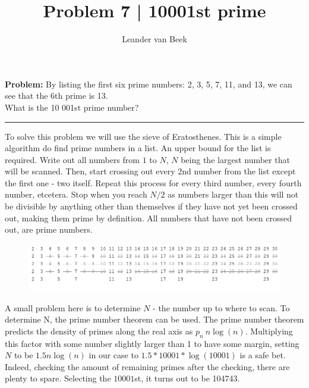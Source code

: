 \documentclass[10pt,a4paper]{article}
\author{Leander van Beek}
\title{Problem 7 | 10001st prime}
\begin{document}
\maketitle

\textbf{Problem:} By listing the first six prime numbers: 2, 3, 5, 7, 11, and 13, we can see that the 6th prime is 13.\\

What is the 10 001st prime number?\\


\vspace{0.5cm}
\hrule
\vspace{0.5cm}

To solve this problem we will use the sieve of Eratosthenes. This is a simple algorithm do find prime numbers in a list. An upper bound for the list is required. Write out all numbers from $1$ to $N$, $N$ being the largest number that will be scanned. Then, start crossing out every 2nd number from the list except the first one - two itself. Repeat this process for every third number, every fourth number, etcetera. Stop when you reach $N/2$ as numbers larger than this will not be divisible by anything other than themselves if they have not yet been crossed out, making them prime by definition. All numbers that have not been crossed out, are prime numbers.\\

\begin{figure}[h]
\centering
\includegraphics[width=0.85\linewidth]{crossings.png}
\end{figure}

A small problem here is to determine $N$ - the number up to where to scan. To determine N, the prime number theorem can be used. The prime number theorem predicts the density of primes along the real axis as $p_n ~ n \log(n)$. Multiplying this factor with some number slightly larger than 1 to have some margin, setting $N$ to be $1.5 n \log(n)$ in our case to $1.5 * 10001 * \log(10001)$ is a safe bet.\\

Indeed, checking the amount of remaining primes after the checking, there are plenty to spare. Selecting the $10001$st, it turns out to be 104743.
\end{document}
